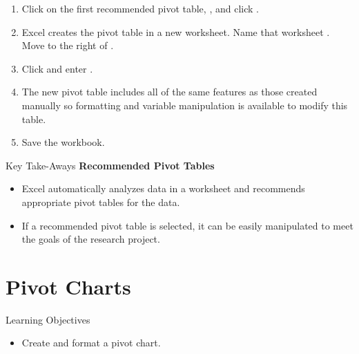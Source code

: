 \begin{enumerate}[resume]
	\item Click on the first recommended pivot table, , and click .
	\item Excel creates the pivot table in a new worksheet. Name that worksheet .
	Move  to the right of .
	\item Click  and enter .
	\item The new pivot table includes all of the same features as those created manually so formatting and variable manipulation is available to modify this table.
	\item Save the workbook.
\end{enumerate}

\begin{center}
	\begin{tkwbox}{Key Take-Aways}
		\textbf{Recommended Pivot Tables}
		\\
		\begin{itemize}
			\setlength{\itemsep}{0pt}
			\setlength{\parskip}{0pt}
			\setlength{\parsep}{0pt}
			
			\item Excel automatically analyzes data in a worksheet and recommends appropriate pivot tables for the data.
			\item If a recommended pivot table is selected, it can be easily manipulated to meet the goals of the research project.
			
		\end{itemize}
	\end{tkwbox}
\end{center}

\section{Pivot Charts}

\begin{center}
	\begin{objbox}{Learning Objectives}
		\begin{itemize}
			\setlength{\itemsep}{0pt}
			\setlength{\parskip}{0pt}
			\setlength{\parsep}{0pt}
			
			\item Create and format a pivot chart.
			
		\end{itemize}
	\end{objbox}
\end{center}

